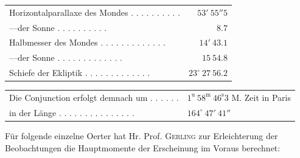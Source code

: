 \begin{center}\small\setlength{\tabcolsep}{3pt}
\begin{tabular}{lr}
Horizontalparallaxe des Mondes . . . . . . . . . . & $53'\ 55''5$ \\
\hspace{1em}---\hspace{1em}der Sonne . . . . . . . . . . & $8.7$ \\
Halbmesser des Mondes . . . . . . . . . . . . . & $14'\ 43.1$ \\
\hspace{1em}---\hspace{1em}der Sonne . . . . . . . . . . . . . & $15\ 54.8$ \\
Schiefe der Ekliptik . . . . . . . . . . . . . & $23^\circ\ 27\ 56.2$ \\
\end{tabular}
\begin{tabular}{ll}
Die Conjunction erfolgt demnach um . . . . . . & $1^{\mathrm u}\ 58^{\mathrm m}\ 46^{\mathrm s}3$ M. Zeit in Paris \\
in der Länge . . . . . . . . . . . . . . . & $164^\circ\ 47'\ 41''$ \\
\end{tabular}
\end{center}

Für folgende einzelne Oerter hat Hr. Prof. \textsc{Gerling} zur Erleichterung der Beobachtungen die Hauptmomente der Erscheinung im Voraus berechnet:

